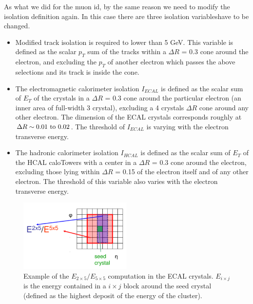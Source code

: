 As what we did for the muon id, by the same reason we need to modify the isolation definition again. In this case there are three isolation variableshave to be changed.

\begin{itemize}
\item Modified track isolation is required to lower than 5 GeV. This variable is defined as the scalar $p_{T}$ sum of the tracks within a $\Delta R$ = 0.3 cone around the electron, and excluding the $p_{T}$ of another electron which passes the above selections and its track is inside the cone.
\item The electromagnetic calorimeter isolation $I_{ECAL}$ is defined as the scalar sum of $E_{T}$ of the crystals in a $\Delta R$ = 0.3 cone around the particular electron (an inner area of full-width 3 crystal), excluding a 4 crystals $\Delta R$ cone around any other electron. The dimension of the ECAL crystals corresponds roughly at $\Delta R \sim 0.01 \textup{ to } 0.02$. The threshold of $I_{ECAL}$ is varying with the electron transverse energy.
\item The hadronic calorimeter isolation $I_{HCAL}$ is defined as the scalar sum of $E_{T}$ of the HCAL caloTowers with a center in a $\Delta R$ = 0.3 cone around the electron, excluding those lying within $\Delta R$ = 0.15 of the electron itself and of any other electron\cite{CMS_AN_2012-168}. The threshold of this variable also varies with the electron transverse energy.
\end{itemize}
\newpage


\begin{figure}
  \begin{center}
    \includegraphics[width=0.5\textwidth]{figure/CH3/E5X5.png}
  \end{center}
  \caption{\label{fig:E5X5}Example of the $E_{2\times5}/E_{5\times5}$ computation in the ECAL crystals. $E_{i \times j}$ is the energy contained in a $i \times j$ block around the seed crystal (defined as the highest deposit of the energy of the cluster).}
\end{figure}

